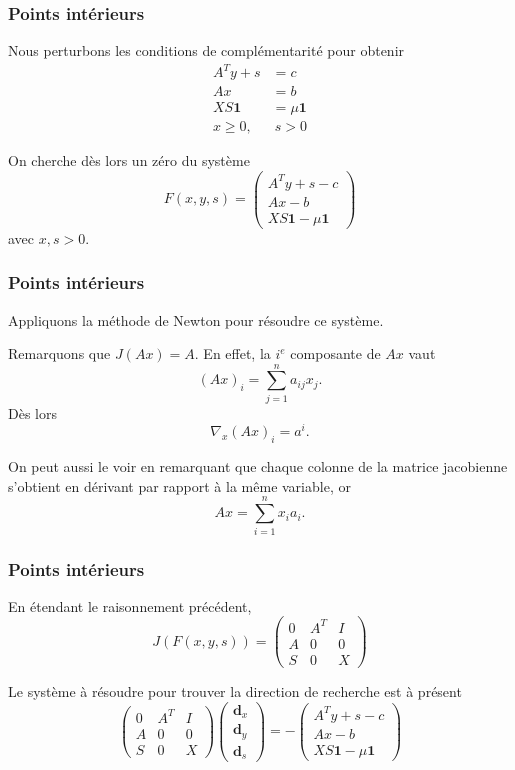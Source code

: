 \documentclass[usepdftitle=false, aspectratio=169]{beamer}
\def\bd{\boldsymbol{d}}
\def\bone{\boldsymbol{1}}
\begin{document}
\begin{frame}
\frametitle{Points intérieurs}

Nous perturbons les conditions de complémentarité pour obtenir
\begin{align*}
A^T y + s &= c \\
Ax &= b \\
XS\bone &= \mu\bone \\
x \geq 0,&\ s > 0
\end{align*}

On cherche dès lors un zéro du système
$$
F(x,y,s) =
\begin{pmatrix}
A^T y + s - c \\
Ax - b \\
XS\bone - \mu\bone
\end{pmatrix}
$$
avec $x, s > 0$.

\end{frame}

\begin{frame}
\frametitle{Points intérieurs}

Appliquons la méthode de Newton pour résoudre ce système.

\mbox{}

Remarquons que $J(Ax) = A$. En effet, la $i^e$ composante de $Ax$ vaut
$$
(Ax)_i = \sum_{j = 1}^n a_{ij} x_j.
$$
Dès lors
$$
\nabla_x (Ax)_i = a^i.
$$

\mbox{}

On peut aussi le voir en remarquant que chaque colonne de la matrice jacobienne s'obtient en dérivant par rapport à la même variable, or
$$
Ax = \sum_{i = 1}^n x_i a_i.
$$

\end{frame}

\begin{frame}
\frametitle{Points intérieurs}

En étendant le raisonnement précédent,
$$
J(F(x,y,s)) =
\begin{pmatrix}
	0 & A^T & I \\
	A & 0 & 0 \\
	S & 0 & X
\end{pmatrix}
$$

\mbox{}

Le système à résoudre pour trouver la direction de recherche est à présent
$$
\begin{pmatrix}
	0 & A^T & I \\
	A & 0 & 0 \\
	S & 0 & X
\end{pmatrix}
\begin{pmatrix}
	\bd_x \\ \bd_y \\ \bd_s
\end{pmatrix}
=
-
\begin{pmatrix}
	A^Ty+s-c \\ Ax-b \\ XS\bone - \mu\bone
\end{pmatrix}
$$

\end{frame}
\end{document}
